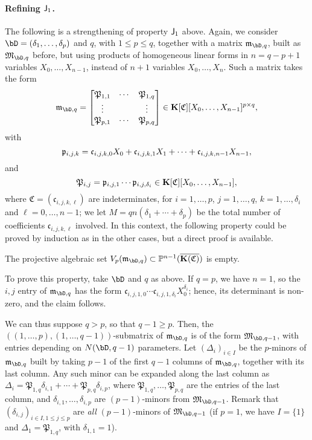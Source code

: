 \documentclass[12pt]{article}
\begin{document}
\paragraph{Refining $\mathsf{J}_1$.} The following  is a strengthening of 
property $\mathsf{J}_1$ above. Again, we consider $\bD=(\delta_1,\dots,\delta_p)$
and $q$, with $1 \le p \le q$, together with a matrix
$\mathfrak{m}_{\bD,q}$, built as $\mathfrak{M}_{\bD,q}$ before, but
using products of homogeneous linear forms in $n=q-p+1$ variables $X_0,\dots,X_{n-1}$, instead of
$n+1$ variables $X_0,\dots,X_n$. Such a matrix takes the form
\begin{align}\label{eq:matM2}
\mathfrak{m}_{\bD,q}=\left [\begin{matrix}
\mathfrak{P}_{1,1} & \cdots & \mathfrak{P}_{1,q}\\
 \vdots & & \vdots\\
\mathfrak{P}_{p,1} & \cdots & \mathfrak{P}_{p,q}
  \end{matrix}\right ]\in \KK[\mathfrak{C}][X_0,\dots,X_{n-1}]^{p\times q},
\end{align}
with 
$$\mathfrak{p}_{i,j,k} = \frak{c}_{i,j,k,0}X_0 + \frak{c}_{i,j,k,1} X_1 +\cdots + \frak{c}_{i,j,k,n-1} X_{n-1},$$
and
$$\mathfrak{P}_{i,j} = \mathfrak{p}_{i,j,1} \cdots
\mathfrak{p}_{i,j,\delta_i} \in \mathbf{K}[\mathfrak{C}][X_0,\dots,X_{n-1}],$$
where $\mathfrak{C}=(\mathfrak{c}_{i,j,k,\ell})$ are indeterminates,
for $i=1,\dots,p$, $j=1,\dots,q$, $k=1,\dots,\delta_i$ and
$\ell=0,\dots,n-1$; we let $M=q n (\delta_1+\cdots +\delta_p)$ be the total
number of coefficients $\mathfrak{c}_{i,j,k,\ell}$ involved. In this context, the
following property could be proved by induction as in the other cases,
but a direct proof is available.

\begin{description}[leftmargin=*]
\item[$\assI_3(\bD,q).$] The projective algebraic set
  $V_p(\mathfrak{m}_{\bD,q}) \subset \P^{n-1}(\KKCbar)$ is empty.
\end{description}
To prove this property, take $\bD$ and $q$ as above. If $q=p$, we have
$n=1$, so the $i,j$ entry of $\mathfrak{m}_{\bD,q}$ has the form
$\mathfrak{c}_{i,j,1,0}\cdots\mathfrak{c}_{i,j,1,\delta_i} X_0^{\delta_i}$; hence, its determinant is non-zero,
and the claim follows.

We can thus suppose $q > p$, so that $q-1 \ge p$.  Then, the
$((1,\dots,p),(1,\dots,q-1))$-submatrix of $\mathfrak{m}_{\bD,q}$ is
of the form $\mathfrak{M}_{\bD,q-1}$, with entries depending on
$N(\bD,q-1)$ parameters.  Let $(\Delta_i)_{i \in I}$ be the $p$-minors
of $\mathfrak{m}_{\bD,q}$ built by taking $p-1$ of the first $q-1$
columns of $\mathfrak{m}_{\bD,q}$, together with its last column.
Any such minor can be expanded along the last column as $\Delta_i =
\mathfrak{P}_{1,q} \delta_{i,1} + \cdots + \mathfrak{P}_{p,q}
\delta_{i,p}$, where $\mathfrak{P}_{1,q},\dots,\mathfrak{P}_{p,q}$ are
the entries of the last column, and $\delta_{i,1},\dots,\delta_{i,p}$
are $(p-1)$-minors from $\mathfrak{M}_{\bD,q-1}$. Remark that
$(\delta_{i,j})_{i \in I, 1 \le j \le p}$ are {\em all} $(p-1)$-minors
of $\mathfrak{M}_{\bD,q-1}$ (if $p=1$, we have $I=\{1\}$ and
$\Delta_1=\mathfrak{P}_{1,q}$, with $\delta_{1,1}=1$).
\end{document}
